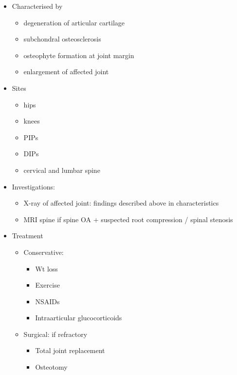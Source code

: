 \documentclass[
  12pt,
]{memoir}
\providecommand{\tightlist}{%
  \setlength{\itemsep}{0pt}\setlength{\parskip}{0pt}}
\begin{document}
\begin{itemize}
\tightlist
\item
  Characterised by

  \begin{itemize}
  \tightlist
  \item
    degeneration of articular cartilage
  \item
    subchondral osteosclerosis
  \item
    osteophyte formation at joint margin
  \item
    enlargement of affected joint
  \end{itemize}
\item
  Sites

  \begin{itemize}
  \tightlist
  \item
    hips
  \item
    knees
  \item
    PIPs
  \item
    DIPs
  \item
    cervical and lumbar spine
  \end{itemize}
\item
  Investigations:

  \begin{itemize}
  \tightlist
  \item
    X-ray of affected joint: findings described above in characteristics
  \item
    MRI spine if spine OA + suspected root compression / spinal stenosis
  \end{itemize}
\item
  Treatment

  \begin{itemize}
  \tightlist
  \item
    Conservative:

    \begin{itemize}
    \tightlist
    \item
      Wt loss
    \item
      Exercise
    \item
      NSAIDs
    \item
      Intraarticular glucocorticoids
    \end{itemize}
  \item
    Surgical: if refractory

    \begin{itemize}
    \tightlist
    \item
      Total joint replacement
    \item
      Osteotomy
    \end{itemize}
  \end{itemize}
\end{itemize}
\end{document}
